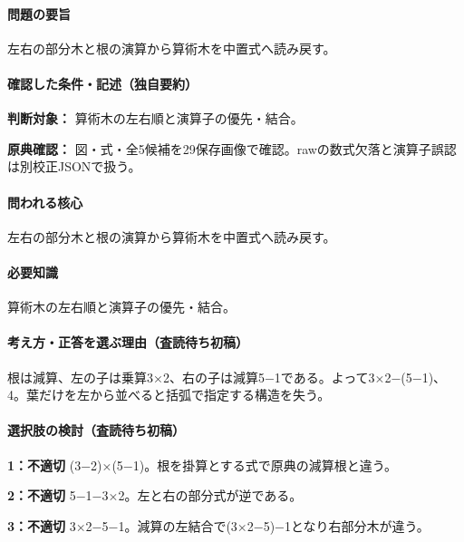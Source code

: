 \paragraph{問題の要旨} 左右の部分木と根の演算から算術木を中置式へ読み戻す。

\paragraph{確認した条件・記述（独自要約）}\mbox{}\par

\noindent\textbf{判断対象：} 算術木の左右順と演算子の優先・結合。\par

\noindent\textbf{原典確認：} 図・式・全5候補を29保存画像で確認。rawの数式欠落と演算子誤認は別校正JSONで扱う。\par

\paragraph{問われる核心} 左右の部分木と根の演算から算術木を中置式へ読み戻す。

\paragraph{必要知識} 算術木の左右順と演算子の優先・結合。

\paragraph{考え方・正答を選ぶ理由（査読待ち初稿）} 根は減算、左の子は乗算3×2、右の子は減算5−1である。よって3×2−(5−1)、4。葉だけを左から並べると括弧で指定する構造を失う。

\paragraph{選択肢の検討（査読待ち初稿）}\mbox{}\par

\noindent\textbf{1：不適切} (3−2)×(5−1)。根を掛算とする式で原典の減算根と違う。\par

\noindent\textbf{2：不適切} 5−1−3×2。左と右の部分式が逆である。\par

\noindent\textbf{3：不適切} 3×2−5−1。減算の左結合で(3×2−5)−1となり右部分木が違う。\par

